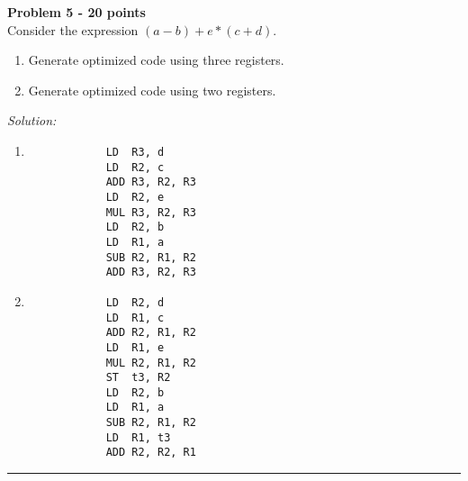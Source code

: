 \documentclass[a4paper, 11pt]{article}
\newenvironment{problem}[2][Problem]
    { \begin{mdframed}[backgroundcolor=gray!20] \textbf{#1 #2} \\}
    {  \end{mdframed}}
\newenvironment{solution}
    {\textit{Solution:}}
    {}
\begin{document}
\begin{problem}{5 - 20 points}
Consider the expression $(a-b) + e * (c+d)$.
\begin{enumerate}[a]
    \item Generate optimized code using three registers.
    \item Generate optimized code using two registers.
\end{enumerate}

\end{problem}

\begin{solution}
    \begin{enumerate}[a]
        \item\begin{verbatim}
            LD  R3, d
            LD  R2, c
            ADD R3, R2, R3
            LD  R2, e 
            MUL R3, R2, R3
            LD  R2, b
            LD  R1, a
            SUB R2, R1, R2
            ADD R3, R2, R3
        \end{verbatim}
        \item \begin{verbatim}
            LD  R2, d
            LD  R1, c
            ADD R2, R1, R2
            LD  R1, e
            MUL R2, R1, R2
            ST  t3, R2
            LD  R2, b
            LD  R1, a
            SUB R2, R1, R2
            LD  R1, t3
            ADD R2, R2, R1
        \end{verbatim}
    \end{enumerate}
\end{solution}

\noindent\rule{7in}{2.8pt}
\end{document}
